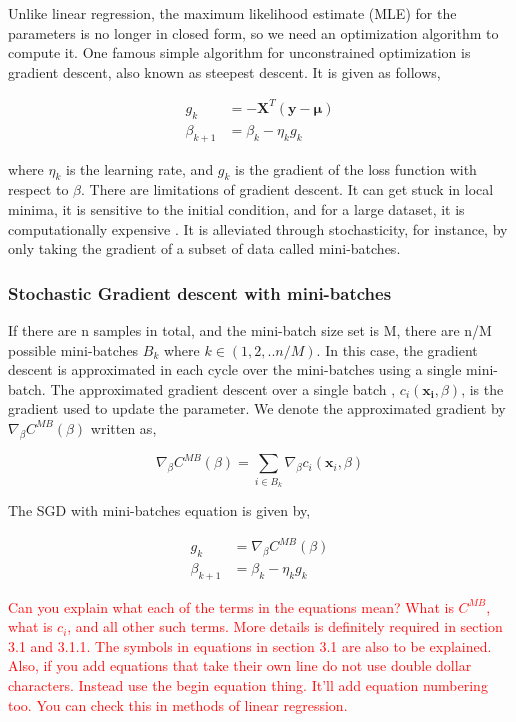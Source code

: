 Unlike linear regression, the maximum likelihood estimate (MLE) for the parameters is no longer in closed form, so we need an optimization algorithm to compute it. One famous simple algorithm for unconstrained optimization is gradient descent, also known as steepest descent. It is given as follows,


\begin{align}
    g_k &= -\mathbf{X}^T(\mathbf{y}-\mathbf{\mu}) \\
    \beta_{k+1} &= \beta_k - \eta_k g_k
\end{align}

where $\eta_k$ is the learning rate, and $g_k$ is the gradient of the loss function with respect to $\mathcal{\beta}$. There are limitations of gradient descent. It can get stuck in local minima, it is sensitive to the initial condition, and for a large dataset, it is computationally expensive \cite{mehta2019high}. It is alleviated through stochasticity, for instance, by only taking the gradient of a subset of data called mini-batches. 

\subsubsection{Stochastic Gradient descent with mini-batches}
If there are n samples in total, and the mini-batch size set is M, there are n/M possible mini-batches $B_k $ where $k \in (1,2,..n/M)$. In this case, the gradient descent is approximated in each cycle over the mini-batches using a single mini-batch. The approximated gradient descent over a single batch , $c_i(\mathbf{x_i},\beta)$, is the gradient used to update the parameter. We denote the approximated gradient by $\nabla_\beta C^{MB}(\beta)$ written as, 

\begin{equation}
    \nabla_{\beta} C^{MB}(\beta) = \sum_{i\in B_k} \nabla_\beta c_i(\textbf{x}_i, \beta)
\end{equation}


The SGD with mini-batches equation is given by, 

\begin{align}
    g_k &=  \nabla_{\beta} C^{MB}(\beta)\\
\beta_{k+1} &= \beta_k - \eta_k g_k
\end{align}


\textcolor{red}{Can you explain what each of the terms in the equations mean? What is $C^{MB}$, what is $c_i$, and all other such terms. More details is definitely required in section 3.1 and 3.1.1. The symbols in equations in section 3.1 are also to be explained. Also, if you add equations that take their own line do not use double dollar characters. Instead use the begin equation thing. It'll add equation numbering too. You can check this in methods of linear regression.}


